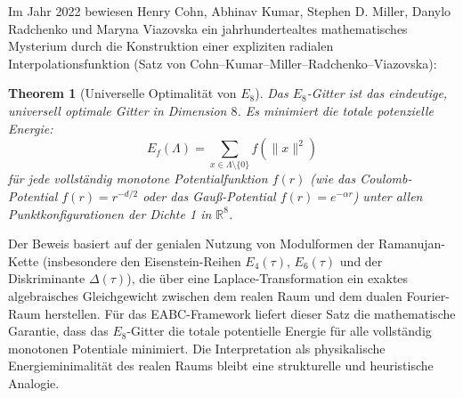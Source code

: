 \documentclass[11pt,a4paper]{article}
\newtheorem{theorem}{Theorem}[section]
\theoremstyle{definition}
\begin{document}
	Im Jahr 2022 bewiesen Henry Cohn, Abhinav Kumar, Stephen D. Miller, Danylo Radchenko und Maryna Viazovska ein jahrhundertealtes mathematisches Mysterium durch die Konstruktion einer expliziten radialen Interpolationsfunktion (Satz von Cohn--Kumar--Miller--Radchenko--Viazovska):
	\begin{theorem}[Universelle Optimalität von $E_8$]
		\label{thm:viazovska_optimal}
		Das $E_8$-Gitter ist das eindeutige, universell optimale Gitter in Dimension $8$. Es minimiert die totale potenzielle Energie:
		\begin{equation}
			E_f(\Lambda) = \sum_{x \in \Lambda \setminus \{0\}} f(\|x\|^2)
		\end{equation}
		für jede vollständig monotone Potentialfunktion $f(r)$ (wie das Coulomb-Potential $f(r) = r^{-d/2}$ oder das Gauß-Potential $f(r) = e^{-\alpha r}$) unter allen Punktkonfigurationen der Dichte 1 in $\mathbb{R}^8$.
	\end{theorem}
	
	Der Beweis basiert auf der genialen Nutzung von Modulformen der Ramanujan-Kette (insbesondere den Eisenstein-Reihen $E_4(\tau)$, $E_6(\tau)$ und der Diskriminante $\Delta(\tau)$), die über eine Laplace-Transformation ein exaktes algebraisches Gleichgewicht zwischen dem realen Raum und dem dualen Fourier-Raum herstellen. Für das EABC-Framework liefert dieser Satz die mathematische Garantie, dass das $E_8$-Gitter die totale potentielle Energie für alle vollständig monotonen Potentiale minimiert. Die Interpretation als physikalische Energieminimalität des realen Raums bleibt eine strukturelle und heuristische Analogie.
	
\end{document}

